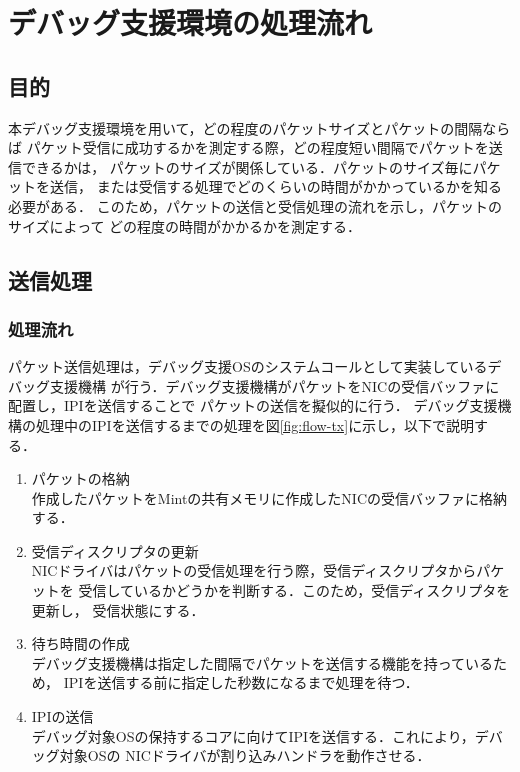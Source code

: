 \documentclass[12pt]{jsarticle}
\begin{document}
\section{デバッグ支援環境の処理流れ}

\subsection{目的}

本デバッグ支援環境を用いて，どの程度のパケットサイズとパケットの間隔ならば
パケット受信に成功するかを測定する際，どの程度短い間隔でパケットを送信できるかは，
パケットのサイズが関係している．パケットのサイズ毎にパケットを送信，
または受信する処理でどのくらいの時間がかかっているかを知る必要がある．
このため，パケットの送信と受信処理の流れを示し，パケットのサイズによって
どの程度の時間がかかるかを測定する．

\subsection{送信処理}

\subsubsection{処理流れ}\label{flow-tx}

パケット送信処理は，デバッグ支援OSのシステムコールとして実装しているデバッグ支援機構
が行う．デバッグ支援機構がパケットをNICの受信バッファに配置し，IPIを送信することで
パケットの送信を擬似的に行う．
デバッグ支援機構の処理中のIPIを送信するまでの処理を図\ref{fig:flow-tx}に示し，以下で説明する．
\begin{enumerate}
    \item パケットの格納\\
        作成したパケットをMintの共有メモリに作成したNICの受信バッファに格納する．
    \item 受信ディスクリプタの更新\\
        NICドライバはパケットの受信処理を行う際，受信ディスクリプタからパケットを
        受信しているかどうかを判断する．このため，受信ディスクリプタを更新し，
        受信状態にする．
    \item 待ち時間の作成\\
        デバッグ支援機構は指定した間隔でパケットを送信する機能を持っているため，
        IPIを送信する前に指定した秒数になるまで処理を待つ．
    \item IPIの送信\\
        デバッグ対象OSの保持するコアに向けてIPIを送信する．これにより，デバッグ対象OSの
        NICドライバが割り込みハンドラを動作させる．
\end{enumerate}
\end{document}
